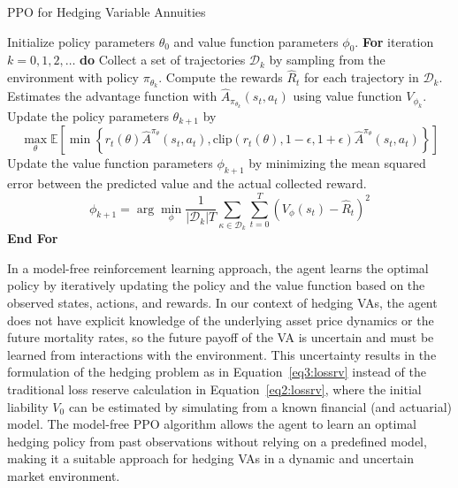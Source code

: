 \begin{algorithm} 
    \caption{PPO for Hedging Variable Annuities} 
    \begin{algorithmic}[1] \label{alg3:ppoHedging}
        \STATE  Initialize policy parameters $\theta_0$ and value function parameters $\phi_0$.
        \STATE  \textbf{For} {iteration $k=0, 1,2,\ldots$} \textbf{do}
        \STATE  \quad Collect a set of trajectories $\mathcal{D}_k$ by sampling from the environment with policy $\pi_{\theta_{k}}$.
        \STATE  \quad Compute the rewards $\hat{R}_t$ for each trajectory in $\mathcal{D}_k$.
        \STATE  \quad Estimates the advantage function with $\hat{A}_{\pi_{\theta_k}}(s_t, a_t)$ using value function $V_{\phi_k}$.
        \STATE  \quad Update the policy parameters $\theta_{k+1}$ by 
        \begin{equation*}
            \max_{\theta} \mathbb{E}\left[ \min \left\{ r_t(\theta)\hat{A}^{\pi_{\theta}}(s_t, a_t), \text{clip}(r_t(\theta), 1-\epsilon, 1 + \epsilon) \hat{A}^{\pi_{\theta}}(s_t, a_t)  \right\} \right]
        \end{equation*}
        \STATE  \quad Update the value function parameters $\phi_{k+1}$ by minimizing the mean squared error between the predicted value and the actual collected reward.
        \begin{equation*}
            \phi_{k+1} = \arg \min_{\phi} \frac{1}{|\mathcal{D}_k|T} \sum_{\mathcal{\kappa} \in \mathcal{D}_k} \sum_{t=0}^{T} \left( V_{\phi}(s_t) - \hat{R}_t \right)^2
        \end{equation*}
        \STATE  \textbf{End For}
    \end{algorithmic}
\end{algorithm}
    
In a model-free reinforcement learning approach, the agent learns the optimal policy by iteratively updating the policy and the value function based on the observed states, actions, and rewards.
In our context of hedging VAs, the agent does not have explicit knowledge of the underlying asset price dynamics or the future mortality rates, so the future payoff of the VA is uncertain and must be learned from interactions with the environment.
This uncertainty results in the formulation of the hedging problem as in Equation~\ref{eq3:lossrv} instead of the traditional loss reserve calculation in Equation~\ref{eq2:lossrv}, where the initial liability $V_0$ can be estimated by simulating from a known financial (and actuarial) model.
The model-free PPO algorithm allows the agent to learn an optimal hedging policy from past observations without relying on a predefined model, making it a suitable approach for hedging VAs in a dynamic and uncertain market environment.

